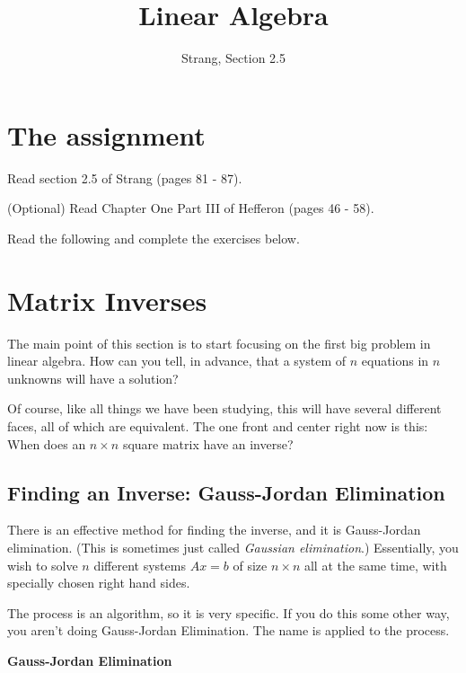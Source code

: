 \documentclass[11pt]{amsart}
\theoremstyle{definition}
\begin{document}
\title{Linear Algebra}
\author{Strang, Section 2.5}
\maketitle

\section{The assignment}
\begin{compactitem}
\item Read section 2.5 of Strang (pages 81 - 87).
\item (Optional) Read Chapter One Part III of Hefferon (pages 46 - 58).
\item Read the following and complete the exercises below.
\end{compactitem}


\section{Matrix Inverses}

The main point of this section is to start focusing on the first big problem in linear algebra. How can you tell, in advance, that a system of $n$ equations in $n$ unknowns will have a solution?

Of course, like all things we have been studying, this will have several different faces, all of which are equivalent. The one front and center right now is this: When does an $n \times n$ square matrix have an inverse?

\subsection{Finding an Inverse: Gauss-Jordan Elimination}

There is an effective method for finding the inverse, and it is Gauss-Jordan elimination. (This is sometimes just called \emph{Gaussian elimination}.) Essentially, you wish to solve $n$ different systems $Ax= b$ of size $n\times n$ all at the same time, with specially chosen right hand sides.


The process is an algorithm, so it is very specific. If you do this some other way, you aren't doing Gauss-Jordan Elimination. The name is applied to the process.

\begin{center}
\textbf{Gauss-Jordan Elimination}
\end{center}
\end{document}
